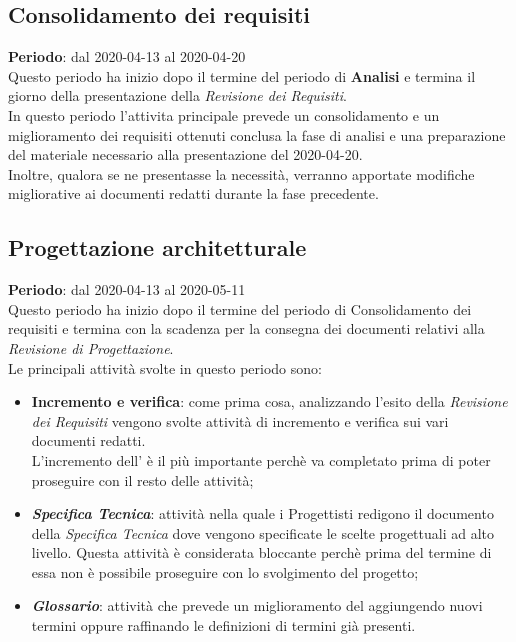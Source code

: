 \subsection{Consolidamento dei requisiti}
\textbf{Periodo}: dal 2020-04-13 al 2020-04-20 \\
Questo periodo ha inizio dopo il termine del periodo di \textbf{Analisi} e termina il giorno della presentazione della \textit{Revisione dei Requisiti}. \\
In questo periodo l'attivita principale prevede un consolidamento e un miglioramento dei requisiti ottenuti conclusa la fase di analisi e una preparazione del materiale necessario alla presentazione del 2020-04-20. \\
Inoltre, qualora se ne presentasse la necessità, verranno apportate modifiche migliorative ai documenti redatti durante la fase precedente.

\subsection{Progettazione architetturale}
\textbf{Periodo}: dal 2020-04-13 al 2020-05-11 \\
Questo periodo ha inizio dopo il termine del periodo di Consolidamento dei requisiti e termina con la scadenza per la consegna dei documenti relativi alla \textit{Revisione di Progettazione}. \\
Le principali attività svolte in questo periodo sono:
\begin{itemize}
	\item \textbf{Incremento e verifica}: come prima cosa, analizzando l'esito della \textit{Revisione dei Requisiti} vengono svolte attività di incremento e verifica sui vari documenti redatti. \\
	L'incremento dell'\textit{\AdR{}} è il più importante perchè va completato prima di poter proseguire con il resto delle attività;
	\item \textbf{\textit{Specifica Tecnica}}: attività nella quale i Progettisti redigono il documento della \textit{Specifica Tecnica} dove vengono specificate le scelte progettuali ad alto livello.
	Questa attività è considerata bloccante perchè prima del termine di essa non è possibile proseguire con lo svolgimento del progetto;
	\item \textbf{\textit{Glossario}}: attività che prevede un miglioramento del \textit{\Glossario{}} aggiungendo nuovi termini oppure raffinando le definizioni di termini già presenti.
\end{itemize}

